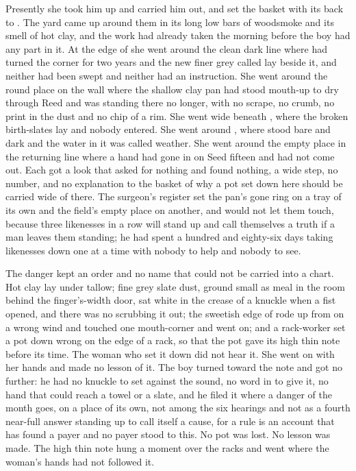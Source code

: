 Presently she took him up and carried him out, and set the basket with its back to . The yard came up around them in its long low bars of woodsmoke and its smell of hot clay, and the work had already taken the morning before the boy had any part in it. At the edge of  she went around the clean dark line where  had turned the corner for two years and the new finer grey called  lay beside it, and neither had been swept and neither had an instruction. She went around the round place on the wall where the shallow clay pan had stood mouth-up to dry through Reed and was standing there no longer, with no scrape, no crumb, no print in the dust and no chip of a rim. She went wide beneath , where the broken birth-slates lay and nobody entered. She went around , where  stood bare and dark and the water in it was called weather. She went around the empty place in the returning line where a hand had gone in on Seed fifteen and had not come out. Each got a look that asked for nothing and found nothing, a wide step, no number, and no explanation to the basket of why a pot set down here should be carried wide of there. The surgeon's register set the pan's gone ring on a tray of its own and the field's empty place on another, and would not let them touch, because three likenesses in a row will stand up and call themselves a truth if a man leaves them standing; he had spent a hundred and eighty-six days taking likenesses down one at a time with nobody to help and nobody to see.

The danger kept an order and no name that could not be carried into a chart. Hot clay lay under tallow; fine grey slate dust, ground small as meal in the room behind the finger's-width door, sat white in the crease of a knuckle when a fist opened, and there was no scrubbing it out; the sweetish edge of  rode up from  on a wrong wind and touched one mouth-corner and went on; and a rack-worker set a pot down wrong on the edge of a rack, so that the pot gave its high thin note before its time. The woman who set it down did not hear it. She went on with her hands and made no lesson of it. The boy turned toward the note and got no further: he had no knuckle to set against the sound, no word in  to give it, no hand that could reach a towel or a slate, and he filed it where a danger of the month goes, on a place of its own, not among the six hearings and not as a fourth near-full answer standing up to call itself a cause, for a rule is an account that has found a payer and no payer stood to this. No pot was lost. No lesson was made. The high thin note hung a moment over the racks and went where the woman's hands had not followed it.

